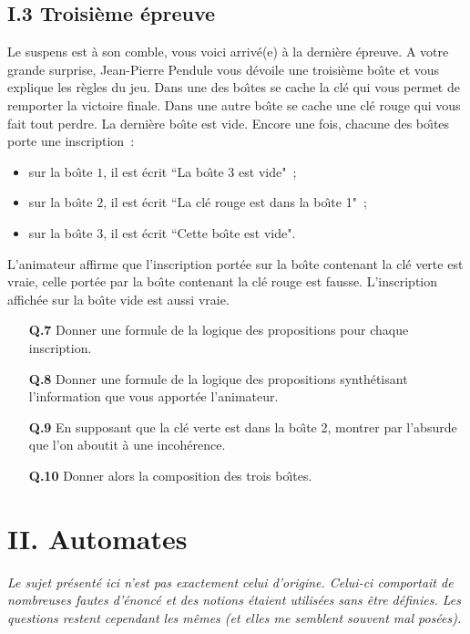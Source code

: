 \documentclass[11pt,a4paper]{article}\nofiles
\begin{document}
\subsection*{I.3 Troisi\`eme \'epreuve}
Le suspens est \`a son comble, vous voici arriv\'e(e) \`a la derni\`ere \'epreuve. 
A votre grande surprise, Jean-Pierre Pendule vous d\'evoile une troisi\`eme bo\^\i te et vous explique les r\`egles du jeu. 
Dans une des bo\^\i tes se cache la cl\'e qui vous permet de remporter la victoire finale. 
Dans une autre bo\^\i te se cache une cl\'e rouge qui vous fait tout perdre. 
La derni\`ere bo\^\i te est vide. 
Encore une fois, chacune des bo\^\i tes porte une inscription~:
\begin{itemize}
\item sur la bo\^\i te $1$, il est \'ecrit ``La bo\^\i te 3 est vide"~;
\item  sur la bo\^\i te $2$, il est \'ecrit ``La cl\'e rouge est dans la bo\^\i te 1"~;
\item  sur la bo\^\i te $3$, il est \'ecrit ``Cette bo\^\i te est vide".
\end{itemize}
L'animateur affirme que l'inscription port\'ee sur la bo\^\i te contenant la cl\'e verte est vraie, celle port\'ee par la bo\^\i te contenant la cl\'e rouge est fausse. 
L'inscription affich\'ee sur la bo\^\i te vide est aussi vraie.
\begin{enumerate}
\item[{\bf Q.7}] Donner une formule de la logique des propositions pour chaque inscription.
\item[{\bf Q.8}] Donner une formule de la logique des propositions synth\'etisant l'information que vous apport\'ee l'animateur.
\item[{\bf Q.9}] En supposant que la cl\'e verte est dans la bo\^\i te 2, montrer par l'absurde que l'on aboutit \`a une incoh\'erence.
\item[{\bf Q.10}] Donner alors la composition des trois bo\^\i tes.
\end{enumerate}

\section*{II. Automates}
\textit{Le sujet pr\'esent\'e ici n'est pas exactement celui d'origine. Celui-ci comportait de nombreuses fautes d'\'enonc\'e et des notions \'etaient utilis\'ees sans \^etre d\'efinies. Les questions restent cependant les m\^emes (et elles me semblent souvent mal pos\'ees).}\\
\end{document}
